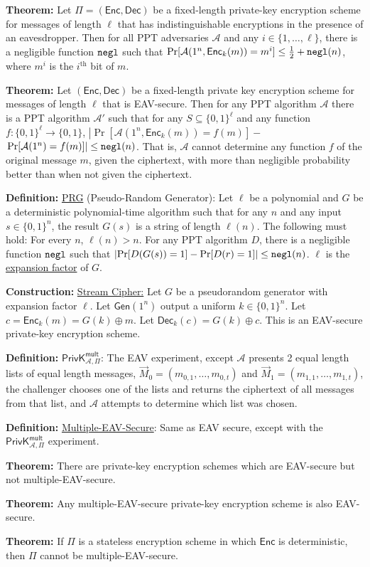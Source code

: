 \documentclass[10pt]{article}
\newcommand{\AAA}{\mathcal{A}}
\newcommand{\defn}[1]{{\bf Definition:} \underline{#1}}
\newcommand{\thm}[1]{{\bf Theorem:} \underline{#1}}
\newcommand{\con}[1]{{\bf Construction:} \underline{#1}}
\newcommand{\Enc}{\mathsf{Enc}}
\newcommand{\Dec}{\mathsf{Dec}}
\newcommand{\Gen}{\mathsf{Gen}}
\newcommand{\ExptMultArgs}[2]{\mathsf{PrivK}^{\mathsf{mult}}_{#1,#2}}
\newcommand{\ExptMult}{\ExptMultArgs{\AAA}{\Pi}}
\newcommand{\xor}{\oplus}
\newcommand{\negl}{{\tt negl}}
\begin{document}
\begin{multicols}{5}
\thm{}Let $\Pi=(\Enc,\Dec)$ be a fixed-length private-key encryption scheme for messages of length $\ell$ that has indistinguishable encryptions in the presence of an eavesdropper. Then for all PPT adversaries $\AAA$ and any $i\in\{1,\dots,\ell\}$, there is a negligible function $\negl$ such that $\Pr[\AAA(1^n,\Enc_k(m))=m^i]\leq\frac{1}{2}+\negl(n)$, where $m^i$ is the $i^{\text{th}}$ bit of $m$.

\thm{}Let $(\Enc,\Dec)$ be a fixed-length private key encryption scheme for messages of length $\ell$ that is EAV-secure. Then for any PPT algorithm $\AAA$ there is a PPT algorithm $\AAA'$ such that for any $S\subseteq\{0,1\}^\ell$ and any function $f:\{0,1\}^\ell\to\{0,1\}$, $\left|\Pr[\AAA(1^n,\Enc_k(m))=f(m)]-\right.$ $\left.\Pr[\AAA(1^n)=f(m)]\right|\leq\negl(n)$. That is, $\AAA$ cannot determine any function $f$ of the original message $m$, given the ciphertext, with more than negligible probability better than when not given the ciphertext.

\defn{PRG} (Pseudo-Random Generator): Let $\ell$ be a polynomial and $G$ be a deterministic polynomial-time algorithm such that for any $n$ and any input $s\in\{0,1\}^n$, the result $G(s)$ is a string of length $\ell(n)$. The following must hold: For every $n$, $\ell(n)>n$. For any PPT algorithm $D$, there is a negligible function $\negl$ such that $\left|\Pr[D(G(s))=1]-\Pr[D(r)=1]\right|\leq\negl(n)$. $\ell$ is the \underline{expansion factor} of $G$.

\con{Stream Cipher:} Let $G$ be a pseudorandom generator with expansion factor $\ell$. Let $\Gen(1^n)$ output a uniform $k\in\{0,1\}^n$. Let $c=\Enc_k(m)=G(k)\xor m$. Let $\Dec_k(c)=G(k)\xor c$. This is an EAV-secure private-key encryption scheme.

\defn{$\ExptMult$}: The EAV experiment, except $\AAA$ presents 2 equal length lists of equal length messages, $\vec{M}_0=(m_{0,1},\dots,m_{0,t})$ and $\vec{M}_1=(m_{1,1},\dots,m_{1,t})$, the challenger chooses one of the lists and returns the ciphertext of all messages from that list, and $\AAA$ attempts to determine which list was chosen.

\defn{Multiple-EAV-Secure}: Same as EAV secure, except with the $\ExptMult$ experiment.

\thm{}There are private-key encryption schemes which are EAV-secure but not multiple-EAV-secure.

\thm{}Any multiple-EAV-secure private-key encryption scheme is also EAV-secure.

\thm{}If $\Pi$ is a stateless encryption scheme in which $\Enc$ is deterministic, then $\Pi$ cannot be multiple-EAV-secure.


\end{multicols}
\end{document}
